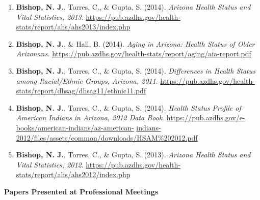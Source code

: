 \documentclass[
]{article}
\begin{document}
\begin{enumerate}
\def\labelenumi{\arabic{enumi}.}
\item
  \textbf{Bishop, N. J.}, Torres, C., \& Gupta, S. (2014). \emph{Arizona
  Health Status and Vital Statistics, 2013}.
  \url{https://pub.azdhs.gov/health-stats/report/ahs/ahs2013/index.php}
\item
  \textbf{Bishop, N. J.}, \& Hall, B. (2014). \emph{Aging in Arizona:
  Health Status of Older Arizonans.}
  \url{https://pub.azdhs.gov/health-stats/report/aging/aia-report.pdf}
\item
  \textbf{Bishop, N. J.}, Torres, C., \& Gupta, S. (2014).
  \emph{Differences in Health Status among Racial/Ethnic Groups,
  Arizona, 2011}.
  \url{https://pub.azdhs.gov/health-stats/report/dhsag/dhsag11/ethnic11.pdf}
\item
  \textbf{Bishop, N. J.}, Torres, C., \& Gupta, S. (2014). \emph{Health
  Status Profile of American Indians in Arizona, 2012 Data Book}.
  \href{https://pub.azdhs.gov/e-books/american-indians/az-american-indians-2012/files/assets/common/downloads/HSAM\%202012.pdf}{https://pub.azdhs.gov/e-books/american-indians/az-american-}
  \href{https://pub.azdhs.gov/e-books/american-indians/az-american-indians-2012/files/assets/common/downloads/HSAM\%202012.pdf}{indians-2012/files/assets/common/downloads/HSAM\%202012.pdf}
\item
  \textbf{Bishop, N. J.}, Torres, C., \& Gupta, S. (2013). \emph{Arizona
  Health Status and Vital Statistics, 2012}.
  \url{https://pub.azdhs.gov/health-stats/report/ahs/ahs2012/index.php}
\end{enumerate}

\textbf{Papers Presented at Professional Meetings}
\end{document}
